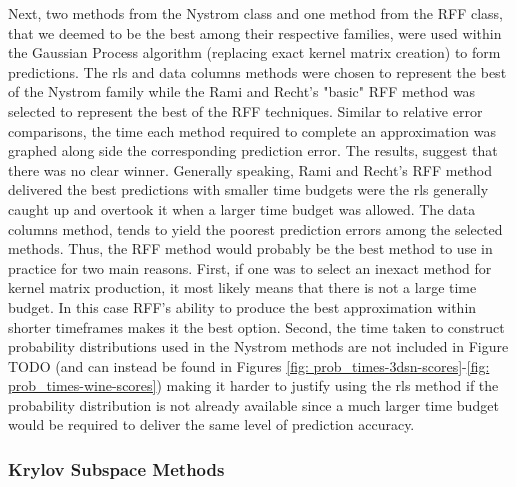 Next, two methods from the Nystrom class and one method from the RFF class, that we deemed to be the best among their respective families, were used within the Gaussian Process algorithm (replacing exact kernel matrix creation) to form predictions. The rls and data columns methods were chosen to represent the best of the Nystrom family while the Rami and Recht's "basic" RFF method was selected to represent the best of the RFF techniques. Similar to relative error comparisons, the time each method required to complete an approximation was graphed along side the corresponding prediction error. The results, suggest that there was no clear winner. Generally speaking, Rami and Recht's RFF method delivered the best predictions with smaller time budgets were the rls generally caught up and overtook it when a larger time budget was allowed. The data columns method, tends to yield the poorest prediction errors among the selected methods. Thus, the RFF method would probably be the best method to use in practice for two main reasons. First, if one was to select an inexact method for kernel matrix production, it most likely means that there is not a large time budget. In this case RFF's ability to produce the best approximation within shorter timeframes makes it the best option. Second, the time taken to construct probability distributions used in the Nystrom methods are not included in Figure TODO (and can instead be found in Figures \ref{fig: prob_times-3dsn-scores}-\ref{fig: prob_times-wine-scores}) making it harder to justify using the rls method if the probability distribution is not already available since a much larger time budget would be required to deliver the same level of prediction accuracy.

\subsubsection{Krylov Subspace Methods}\label{Section5.3.2}

